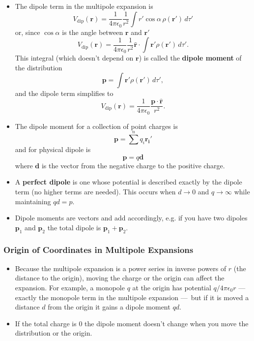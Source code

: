 \documentclass{article}
\renewcommand{\vec}[1]{\boldsymbol{\mathbf{#1}}}
\newcommand{\uvec}[1]{\hat{\vec{#1}}}
\newcommand{\ke}{\frac{1}{4 \pi \epsilon_0}}
\begin{document}
\begin{itemize}
  \item The dipole term in the multipole expansion is \[V_\text{dip}(\vec{r}) = \ke \frac{1}{r^2} \int r' \cos \alpha \,\rho (\vec{r}') \,d \tau'\] or, since $\cos \alpha$ is the angle between $\vec{r}$ and $\vec{r}'$ \[V_\text{dip}(\vec{r}) = \ke \frac{1}{r^2} \uvec{r} \cdot \int \vec{r}' \rho(\vec{r}') \,d \tau'.\] This integral (which doesn't depend on $\vec{r}$) is called the \textbf{dipole moment} of the distribution \[\vec{p} = \int \vec{r}' \rho(\vec{r}') \,d \tau',\] and the dipole term simplifies to \[V_\text{dip}(\vec{r}) = \ke \frac{\vec{p} \cdot \uvec{r}}{r^2}.\]

  \item The dipole moment for a collection of point charges is \[\vec{p} = \sum^n q_i \vec{r_i}'\] and for physical dipole is \[\vec{p} = q \vec{d}\] where $\vec{d}$ is the vector from the negative charge to the positive charge.

  \item A \textbf{perfect dipole} is one whose potential is described exactly by the dipole term (no higher terms are needed). This occurs when $d \rightarrow 0$ and $q \rightarrow \infty$ while maintaining $q d = p$.

  \item Dipole moments are vectors and add accordingly, e.g. if you have two dipoles $\vec{p}_1$ and $\vec{p}_2$ the total dipole is $\vec{p}_1 + \vec{p}_2$.
\end{itemize}

\subsubsection{Origin of Coordinates in Multipole Expansions}

\begin{itemize}
  \item Because the multipole expansion is a power series in inverse powers of $r$ (the distance to the origin), moving the charge or the origin can affect the expansion. For example, a monopole $q$ at the origin has potential $q / 4 \pi \epsilon_0 r$ — exactly the monopole term in the multipole expansion — but if it is moved a distance $d$ from the origin it gains a dipole moment $q d$.

  \item If the total charge is $0$ the dipole moment doesn't change when you move the distribution or the origin.
\end{itemize}
\end{document}

